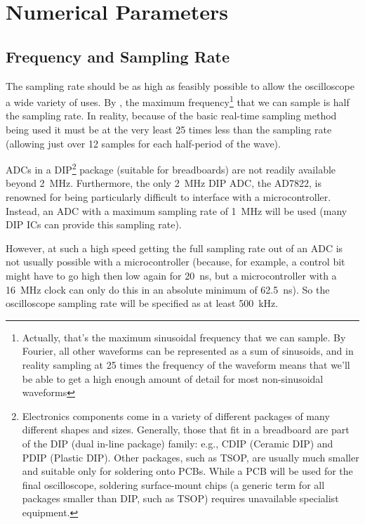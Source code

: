 \section{Numerical Parameters}

\subsection*{Frequency and Sampling Rate}

The sampling rate should be as high as feasibly possible to allow the
oscilloscope a wide variety of uses. By \textcite{ShanonNyquist}, the maximum
frequency\footnote{Actually, that's the maximum sinusoidal frequency that we can
sample. By Fourier, all other waveforms can be represented as a sum of
sinusoids, and in reality sampling at 25 times the frequency of the waveform
means that we'll be able to get a high enough amount of detail for most
non-sinusoidal waveforms} that we can sample is half the sampling rate. In
reality, because of the basic real-time sampling method being used it must be at
the very least 25 times less than the sampling rate (allowing just over 12
samples for each half-period of the wave).

ADCs in a DIP\footnote{Electronics components come in a variety of different
packages of many different shapes and sizes. Generally, those that fit in a
breadboard are part of the DIP (dual in-line package) family: e.g., CDIP
(Ceramic DIP) and PDIP (Plastic DIP). Other packages, such as TSOP, are usually
much smaller and suitable only for soldering onto PCBs. While a PCB will be used
for the final oscilloscope, soldering surface-mount chips (a generic term for
all packages smaller than DIP, such as TSOP) requires unavailable specialist
equipment.} package (suitable for breadboards) are not readily available beyond
\SI{2}{\MHz}. Furthermore, the only \SI{2}{\MHz} DIP ADC, the AD7822, is
renowned for being particularly difficult to interface with a microcontroller.
Instead, an ADC with a maximum sampling rate of \SI{1}{\MHz} will be used (many
DIP ICs can provide this sampling rate).

However, at such a high speed getting the full sampling rate out of an ADC is
not usually possible with a microcontroller (because, for example, a control bit
might have to go high then low again for \SI{20}{\ns}, but a microcontroller
with a \SI{16}{\MHz} clock can only do this in an absolute minimum of
\SI{62.5}{\ns}). So the oscilloscope sampling rate will be specified as at least
\SI{500}{\kHz}.

